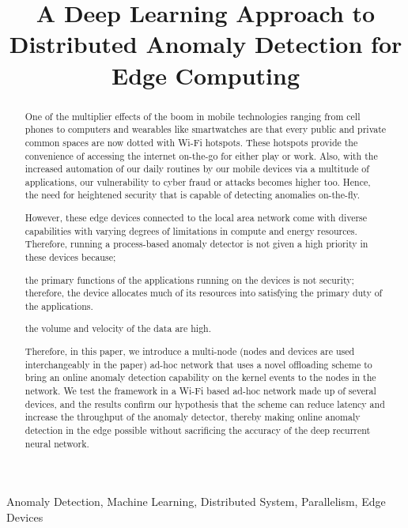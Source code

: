 \documentclass[conference]{IEEEtran}
\begin{document}
\title{A Deep Learning Approach to Distributed Anomaly 
Detection for Edge Computing
}

\author{
	}


\maketitle

\begin{abstract}
One of the multiplier effects of the boom in mobile 
technologies ranging from cell phones to computers and 
wearables like smartwatches are that every public and private 
common spaces are now dotted with Wi-Fi hotspots. These 
hotspots provide the convenience of accessing the internet 
on-the-go for either play or work. Also, with the increased 
automation of our daily routines by our mobile devices via a 
multitude of applications, our vulnerability to cyber fraud 
or attacks becomes higher too. Hence, the need for heightened 
security that is capable of detecting anomalies on-the-fly. 
\par 
However, these edge devices connected to the local area 
network come with diverse capabilities with varying degrees 
of limitations in compute and energy resources. Therefore, 
running a process-based anomaly detector is not given a high 
priority in these devices because; 
\begin{enumerate*}[label={\alph*)},font={\bfseries}]
	\item the primary functions of the applications running 
	on the devices is not security; therefore, the device 
	allocates much of its resources into satisfying the 
	primary duty of the applications.
	\item the volume and velocity of the data are high.
\end{enumerate*}
Therefore, in this paper, we introduce a multi-node (nodes 
and devices are used interchangeably in the paper) ad-hoc 
network that uses a novel offloading scheme to bring an 
online anomaly detection capability on the kernel events to 
the nodes in the network. We test the framework in a Wi-Fi 
based ad-hoc network made up of several devices, and the 
results confirm our hypothesis that the scheme can reduce 
latency and increase the throughput of the anomaly detector, 
thereby making online anomaly detection in the edge possible 
without sacrificing the accuracy of the deep recurrent neural 
network.
\end{abstract}

\begin{IEEEkeywords}
Anomaly Detection, Machine Learning, Distributed System, 
Parallelism, Edge Devices
\end{IEEEkeywords}




\end{document}
